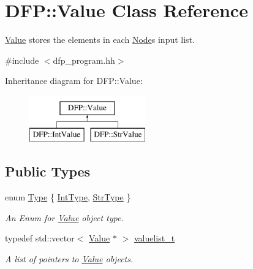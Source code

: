 \hypertarget{class_d_f_p_1_1_value}{}\section{D\+FP\+:\+:Value Class Reference}
\label{class_d_f_p_1_1_value}


\hyperlink{class_d_f_p_1_1_value}{Value} stores the elements in each \hyperlink{class_d_f_p_1_1_node}{Node}\textquotesingle{}s input list.  




{\ttfamily \#include $<$dfp\+\_\+program.\+hh$>$}

Inheritance diagram for D\+FP\+:\+:Value\+:\begin{figure}[H]
\begin{center}
\leavevmode
\includegraphics[height=2.000000cm]{class_d_f_p_1_1_value}
\end{center}
\end{figure}
\subsection*{Public Types}
\begin{DoxyCompactItemize}
\item 
enum \hyperlink{class_d_f_p_1_1_value_ab50504401cc3c884a5c6eb8708f8a214}{Type} \{ \hyperlink{class_d_f_p_1_1_value_ab50504401cc3c884a5c6eb8708f8a214a0a8aa2cb5add38d33229c160220a5456}{Int\+Type}, 
\hyperlink{class_d_f_p_1_1_value_ab50504401cc3c884a5c6eb8708f8a214a07b832a0a41fd9d2402d688010a733d6}{Str\+Type}
 \}\begin{DoxyCompactList}\small\item\em An Enum for \hyperlink{class_d_f_p_1_1_value}{Value} object type. \end{DoxyCompactList}
\item 
typedef std\+::vector$<$ \hyperlink{class_d_f_p_1_1_value}{Value} $\ast$ $>$ \hyperlink{class_d_f_p_1_1_value_a2ca981be3c47c7d23213c08379d3c947}{valuelist\+\_\+t}\hypertarget{class_d_f_p_1_1_value_a2ca981be3c47c7d23213c08379d3c947}{}\label{class_d_f_p_1_1_value_a2ca981be3c47c7d23213c08379d3c947}

\begin{DoxyCompactList}\small\item\em A list of pointers to \hyperlink{class_d_f_p_1_1_value}{Value} objects. \end{DoxyCompactList}\end{DoxyCompactItemize}
